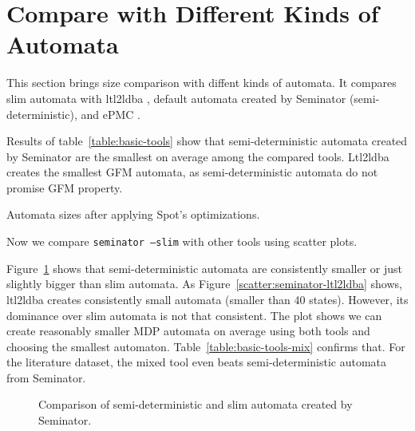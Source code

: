 \documentclass[
	digital,
nolof, nolot
]{fithesis3}
\begin{document}
	\clearpage
		\section{Compare with Different Kinds of Automata}
		This section brings size comparison with diffent kinds of automata. It compares slim automata with ltl2ldba \cite{ltl2ldba}, default automata created by Seminator (semi-deterministic), and ePMC \cite{epmc}.
		
		Results of table~\ref{table:basic-tools} show that semi-deterministic automata created by Seminator are the smallest on average among the compared tools. Ltl2ldba creates the smallest GFM automata, as semi-deterministic automata do not promise GFM property.
		
		\begin{table}[ht]
			\centering
			
			\caption{Automata sizes after applying Spot's optimizations.}
			\label{table:basic-tools}
			
		\end{table}
		
		
		
		Now we compare \texttt{seminator --slim} with other tools using scatter plots.
		
		Figure~\ref{scatter:seminator-slim-default} shows that semi-deterministic automata are consistently smaller or just slightly bigger than slim automata. 
		As Figure~\ref{scatter:seminator-ltl2ldba} shows, ltl2ldba creates consistently small automata (smaller than 40 states). However, its dominance over slim automata is not that consistent. The plot shows we can create reasonably smaller MDP automata on average using both tools and choosing the smallest automaton. Table~\ref{table:basic-tools-mix} confirms that. For the literature dataset, the mixed tool even beats semi-deterministic automata from Seminator.
		\begin{figure}[ht]
			\centering
			
			\caption{Comparison of semi-deterministic and slim automata created by Seminator.}
			\label{scatter:seminator-slim-default}
			\begin{tikzpicture}
				
			\end{tikzpicture}
		\end{figure}
		
\end{document}
